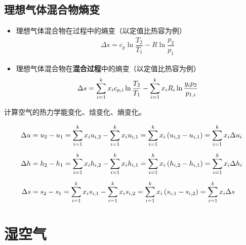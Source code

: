 \subsection{理想气体混合物熵变}
\begin{itemize}
	\item 理想气体混合物在过程中的熵变（以定值比热容为例）
	\begin{align}
		\Delta s = c_p \ln \dfrac{T_2}{T_1} - R \ln \dfrac{p_2}{p_1}
	\end{align}
	\item 理想气体混合物在\textbf{混合过程}中的熵变（以定值比热容为例）
	\begin{align}
		\Delta s = \sum_{i = 1}^k x_i c_{p, i} \ln \dfrac{T_2}{T_1} - \sum_{i = 1}^k x_i R_i \ln \dfrac{y_i p_2}{p_{1, i}}
	\end{align}
\end{itemize}

\examples 计算空气的热力学能变化、焓变化、熵变化。

\solve
\begin{align*}
	\Delta u &= u_2 - u_1 = \sum_{i = 1}^k x_i u_{i,2} - \sum_{i = 1}^k x_i u_{i, 1} = \sum_{i = 1}^k x_i \left(u_{i,2} - u_{i, 1}\right) = \sum_{i = 1}^k x_i \Delta u_i\\[0.5em]
	\Delta h &= h_2 -h_1 = \sum_{i = 1}^k x_i h_{i, 2} - \sum_{i = 1}^k x_i h_{i ,1} = \sum_{i = 1}^k x_i \left(h_{i,2} - h_{i, 1}\right) = \sum_{i = 1}^k x_i \Delta h_i\\[0.5em]
	\Delta s &= s_2 - s_1 = \sum_{i = 1}^k x_i s_{i, 1} - \sum_{i = 1}^k x_i s_{i ,2} = \sum_{i = 1}^k x_i\left(s_{i, 1} - s_{i ,2}\right) = \sum_{i = 1}^k x_i \Delta s
\end{align*}

\vspace*{-2em}

\section{湿空气}




























